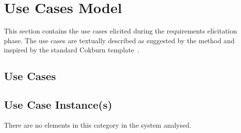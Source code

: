 \section{Use Cases Model}
\label{sec:lu.uni.lassy.excalibur.group03.requirements.analysis-gendescr-usecasemodel}

This section contains the use cases elicited during the requirements elicitation phase.
The use cases are textually described as suggested by the \msrmessir method and inspired by the standard Cokburn template~\cite{armour01usecase}.


\subsection{Use Cases}
































\pagebreak
\subsection{Use Case Instance(s)}

There are no elements in this category in the system analysed.

